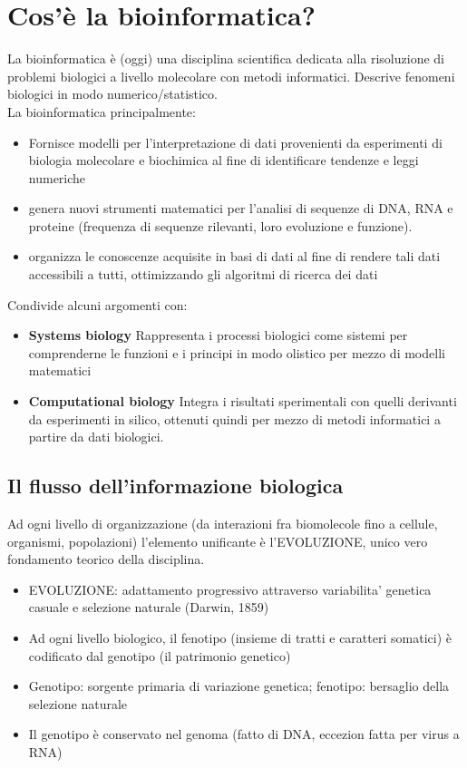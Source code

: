 \documentclass{article}
\begin{document}
\section{Cos'è la bioinformatica?}
La bioinformatica è (oggi) una disciplina scientifica dedicata alla risoluzione di problemi biologici a livello
molecolare con metodi informatici. Descrive fenomeni biologici in modo numerico/statistico.
\\
La bioinformatica principalmente:
    \begin{itemize}
        \item Fornisce modelli per l'interpretazione di dati provenienti da esperimenti di biologia molecolare e biochimica al fine di identificare tendenze e leggi numeriche
        \item genera nuovi strumenti matematici per l'analisi di sequenze di DNA, RNA e proteine (frequenza di sequenze rilevanti, loro evoluzione e funzione).
        \item organizza le conoscenze acquisite in basi di dati al fine di rendere tali dati accessibili a tutti, ottimizzando gli algoritmi di ricerca dei dati
    \end{itemize}
Condivide alcuni argomenti con:
    \begin{itemize} 
        \item \textbf{Systems biology}
            \subitem{-} Rappresenta i processi biologici come sistemi per comprenderne le funzioni e i principi in modo olistico per mezzo di modelli matematici
        \item \textbf{Computational biology}
            \subitem{-} Integra i risultati sperimentali con quelli derivanti da esperimenti in silico, ottenuti quindi per mezzo di metodi informatici a partire da dati biologici.
    \end{itemize}
\subsection{Il flusso dell'informazione biologica}
Ad ogni livello di organizzazione (da interazioni fra biomolecole fino a cellule, organismi,
popolazioni) l'elemento unificante è l'EVOLUZIONE, unico vero fondamento
teorico della disciplina.\\
\begin{itemize}
    \item EVOLUZIONE: adattamento progressivo attraverso
    variabilita' genetica casuale e selezione naturale (Darwin,
    1859)
    \item Ad ogni livello biologico, il fenotipo (insieme di tratti e
    caratteri somatici) è codificato dal genotipo (il patrimonio
    genetico)
    \item Genotipo: sorgente primaria di variazione genetica;
    fenotipo: bersaglio della selezione naturale
    \item Il genotipo è conservato nel genoma (fatto di DNA,
    eccezion fatta per virus a RNA)
\end{itemize}
\end{document}
